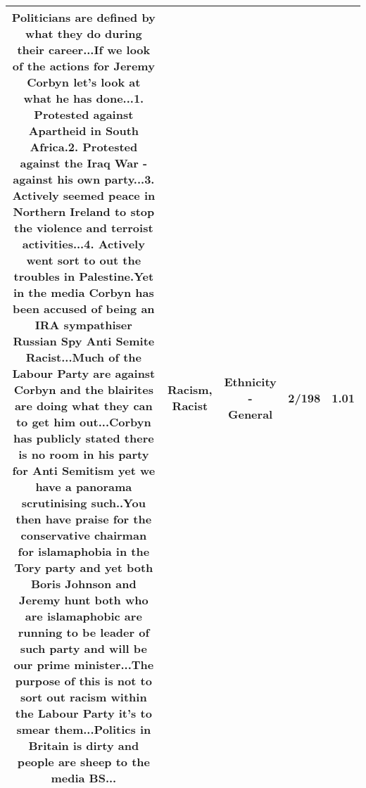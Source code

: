 \documentclass[11pt]{article}
\newlength\mylength
\begin{document}
\begin{center}
\begin{longtable}{|C{.65\mylength}|C{.30\mylength}|C{.12\mylength}|C{.12\mylength}|C{.12\mylength}|}
  \small Politicians are defined by what they do during their career...If we look of the actions for Jeremy Corbyn let's look at what he has done...1. Protested against Apartheid in South Africa.2. Protested against the Iraq War - against his own party...3. Actively seemed peace in Northern Ireland to stop the violence and terroist activities...4. Actively went sort to out the troubles in Palestine.Yet in the media Corbyn has been accused of being an IRA sympathiser Russian Spy Anti Semite \textbf{Racist}...Much of the Labour Party are against Corbyn and the blairites are doing what they can to get him out...Corbyn has publicly stated there is no room in his party for Anti Semitism yet we have a panorama scrutinising such..You then have praise for the conservative chairman for islamaphobia in the Tory party and yet both Boris Johnson and Jeremy hunt both who are islamaphobic are running to be leader of such party and will be our prime minister...The purpose of this is not to sort out \textbf{racism} within the Labour Party it's to smear them...Politics in Britain is dirty and people are sheep to the media BS...\normalsize   & Racism, Racist & Ethnicity - General & 2/198 & 1.01 \\  \hline

\end{longtable}
\end{center}
\end{document}
